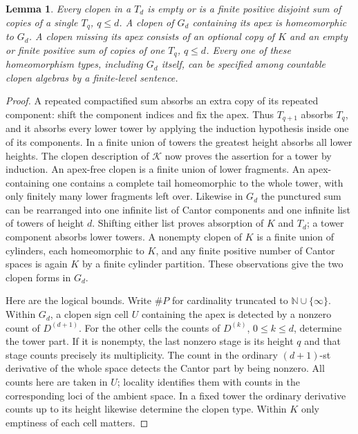 \documentclass[11pt,letterpaper]{article}
\newtheorem{lemma}[theorem]{Lemma}
\theoremstyle{definition}\newtheorem{definition}[theorem]{Definition}
\newcommand{\N}{\mathbb N}
\begin{document}
\begin{lemma}\label{lem:fragments}
Every clopen in a \(T_d\) is empty or is a finite positive disjoint sum
of copies of a single \(T_q\), \(q\le d\). A clopen of \(G_d\) containing
its apex is homeomorphic to \(G_d\). A clopen missing its apex consists of
an optional copy of \(K\) and an empty or finite positive sum of copies of
one \(T_q\), \(q\le d\). Every one of these homeomorphism types, including
\(G_d\) itself, can be specified among countable clopen algebras by a
finite-level sentence.
\end{lemma}
\begin{proof}
A repeated compactified sum absorbs an extra copy of its repeated component:
shift the component indices and fix the apex. Thus \(T_{q+1}\) absorbs
\(T_q\), and it absorbs every lower tower by applying the induction
hypothesis inside one of its components. In a finite union of towers the
greatest height absorbs all lower heights. The clopen description of
\(\mathcal K\) now proves the assertion for a tower by induction. An
apex-free clopen is a finite union of lower fragments. An apex-containing
one contains a complete tail homeomorphic to the whole tower, with only
finitely many lower fragments left over. Likewise in \(G_d\) the punctured
sum can be rearranged into one infinite list of Cantor components and
one infinite list of towers of height \(d\). Shifting either list proves
absorption of \(K\) and \(T_d\); a tower component absorbs lower towers.
A nonempty clopen of \(K\) is a finite union of cylinders, each homeomorphic
to \(K\), and any finite positive number of Cantor spaces is again \(K\)
by a finite cylinder partition. These observations give the two clopen
forms in \(G_d\).

Here are the logical bounds. Write \(\#P\) for cardinality truncated to
\(\N\cup\{\infty\}\). Within \(G_d\), a clopen sign cell \(U\) containing
the apex is detected by a nonzero count of \(D^{(d+1)}\). For the other
cells the counts of \(D^{(k)}\), \(0\le k\le d\), determine the tower
part. If it is nonempty, the last nonzero stage is its height \(q\) and
that stage counts precisely its multiplicity. The count in the ordinary
\((d+1)\)-st derivative of the whole space detects the Cantor part by
being nonzero. All counts here are taken in \(U\); locality identifies
them with counts in the corresponding loci of the ambient space. In a
fixed tower the ordinary derivative counts up to its height likewise
determine the clopen type. Within \(K\) only emptiness of each cell
matters.


\end{proof}
\end{document}
